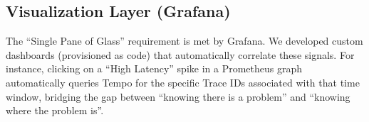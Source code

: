 \subsection{Visualization Layer (Grafana)}
The ``Single Pane of Glass'' requirement is met by Grafana. We developed custom dashboards (provisioned as code) that automatically correlate these signals. For instance, clicking on a ``High Latency'' spike in a Prometheus graph automatically queries Tempo for the specific Trace IDs associated with that time window, bridging the gap between ``knowing there is a problem'' and ``knowing where the problem is''.
